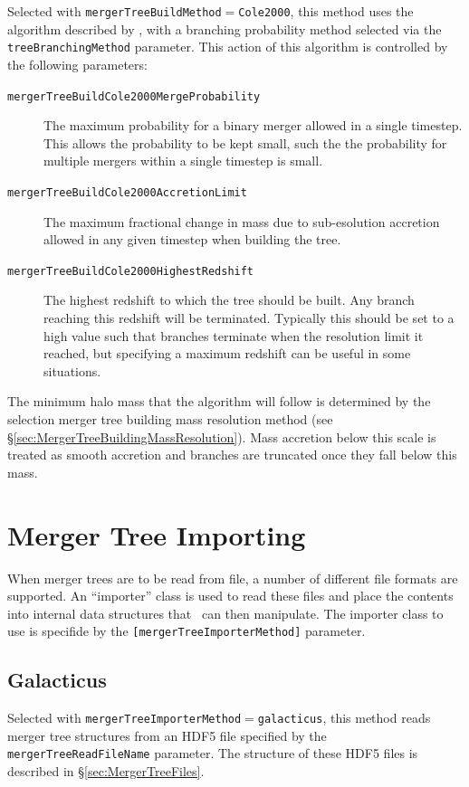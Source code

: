 Selected with {\tt mergerTreeBuildMethod}$=${\tt Cole2000}, this method uses the algorithm described by \cite{cole_hierarchical_2000}, with a branching probability method selected via the {\tt treeBranchingMethod} parameter. This action of this algorithm is controlled by the following parameters:
\begin{description}
 \item [{\tt mergerTreeBuildCole2000MergeProbability}] The maximum probability for a binary merger allowed in a single timestep. This allows the probability to be kept small, such the the probability for multiple mergers within a single timestep is small.
 \item [{\tt mergerTreeBuildCole2000AccretionLimit}] The maximum fractional change in mass due to sub-esolution accretion allowed in any given timestep when building the tree.
 \item [{\tt mergerTreeBuildCole2000HighestRedshift}] The highest redshift to which the tree should be built. Any branch reaching this redshift will be terminated. Typically this should be set to a high value such that branches terminate when the resolution limit it reached, but specifying a maximum redshift can be useful in some situations.
\end{description}
The minimum halo mass that the algorithm will follow is determined by the selection merger tree building mass resolution method (see \S\ref{sec:MergerTreeBuildingMassResolution}). Mass accretion below this scale is treated as smooth accretion and branches are truncated once they fall below this mass.

\section{Merger Tree Importing}\label{sec:MergerTreeImporters}

When merger trees are to be read from file, a number of different file formats are supported. An ``importer'' class is used to read these files and place the contents into internal data structures that \glc\ can then manipulate. The importer class to use is specifide by the {\tt [mergerTreeImporterMethod]} parameter.

\subsection{Galacticus}\label{phys:mergerTreeImporter:mergerTreeImporterGalacticus}

Selected with {\tt mergerTreeImporterMethod}$=${\tt galacticus}, this method reads merger tree structures from an HDF5 file specified by the {\tt mergerTreeReadFileName} parameter. The structure of these HDF5 files is described in \S\ref{sec:MergerTreeFiles}.


